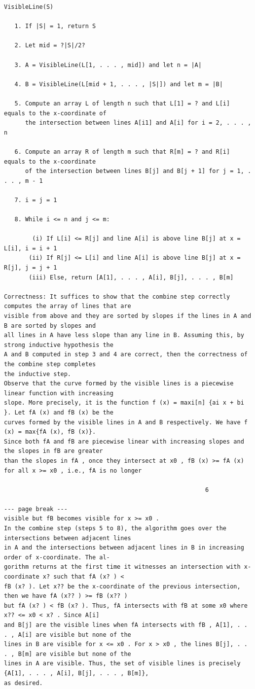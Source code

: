 \documentclass[12pt]{article}
\begin{document}
\begin{Verbatim}[breaklines=true,fontsize=\small]
VisibleLine(S)

   1. If |S| = 1, return S

   2. Let mid = ?|S|/2?

   3. A = VisibleLine(L[1, . . . , mid]) and let n = |A|

   4. B = VisibleLine(L[mid + 1, . . . , |S|]) and let m = |B|

   5. Compute an array L of length n such that L[1] = ? and L[i] equals to the x-coordinate of
      the intersection between lines A[i1] and A[i] for i = 2, . . . , n

   6. Compute an array R of length m such that R[m] = ? and R[i] equals to the x-coordinate
      of the intersection between lines B[j] and B[j + 1] for j = 1, . . . , m - 1

   7. i = j = 1

   8. While i <= n and j <= m:

        (i) If L[i] <= R[j] and line A[i] is above line B[j] at x = L[i], i = i + 1
       (ii) If R[j] <= L[i] and line A[i] is above line B[j] at x = R[j], j = j + 1
       (iii) Else, return [A[1], . . . , A[i], B[j], . . . , B[m]

Correctness: It suffices to show that the combine step correctly computes the array of lines that are
visible from above and they are sorted by slopes if the lines in A and B are sorted by slopes and
all lines in A have less slope than any line in B. Assuming this, by strong inductive hypothesis the
A and B computed in step 3 and 4 are correct, then the correctness of the combine step completes
the inductive step.
Observe that the curve formed by the visible lines is a piecewise linear function with increasing
slope. More precisely, it is the function f (x) = maxi[n] {ai x + bi }. Let fA (x) and fB (x) be the
curves formed by the visible lines in A and B respectively. We have f (x) = max{fA (x), fB (x)}.
Since both fA and fB are piecewise linear with increasing slopes and the slopes in fB are greater
than the slopes in fA , once they intersect at x0 , fB (x) >= fA (x) for all x >= x0 , i.e., fA is no longer

                                                         6

--- page break ---
visible but fB becomes visible for x >= x0 .
In the combine step (steps 5 to 8), the algorithm goes over the intersections between adjacent lines
in A and the intersections between adjacent lines in B in increasing order of x-coordinate. The al-
gorithm returns at the first time it witnesses an intersection with x-coordinate x? such that fA (x? ) <
fB (x? ). Let x?? be the x-coordinate of the previous intersection, then we have fA (x?? ) >= fB (x?? )
but fA (x? ) < fB (x? ). Thus, fA intersects with fB at some x0 where x?? <= x0 < x? . Since A[i]
and B[j] are the visible lines when fA intersects with fB , A[1], . . . , A[i] are visible but none of the
lines in B are visible for x <= x0 . For x > x0 , the lines B[j], . . . , B[m] are visible but none of the
lines in A are visible. Thus, the set of visible lines is precisely {A[1], . . . , A[i], B[j], . . . , B[m]},
as desired.


\end{Verbatim}
\end{document}
